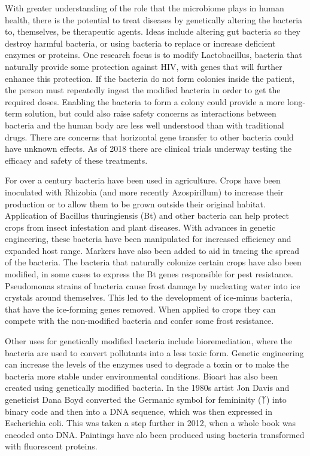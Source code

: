 With greater understanding of the role that the microbiome plays in human health, there is the potential to treat diseases by genetically altering the bacteria to, themselves, be therapeutic agents. Ideas include altering gut bacteria so they destroy harmful bacteria, or using bacteria to replace or increase deficient enzymes or proteins. One research focus is to modify Lactobacillus, bacteria that naturally provide some protection against HIV, with genes that will further enhance this protection. If the bacteria do not form colonies inside the patient, the person must repeatedly ingest the modified bacteria in order to get the required doses. Enabling the bacteria to form a colony could provide a more long-term solution, but could also raise safety concerns as interactions between bacteria and the human body are less well understood than with traditional drugs. There are concerns that horizontal gene transfer to other bacteria could have unknown effects. As of 2018 there are clinical trials underway testing the efficacy and safety of these treatments.

For over a century bacteria have been used in agriculture. Crops have been inoculated with Rhizobia (and more recently Azospirillum) to increase their production or to allow them to be grown outside their original habitat. Application of Bacillus thuringiensis (Bt) and other bacteria can help protect crops from insect infestation and plant diseases. With advances in genetic engineering, these bacteria have been manipulated for increased efficiency and expanded host range. Markers have also been added to aid in tracing the spread of the bacteria. The bacteria that naturally colonize certain crops have also been modified, in some cases to express the Bt genes responsible for pest resistance. Pseudomonas strains of bacteria cause frost damage by nucleating water into ice crystals around themselves. This led to the development of ice-minus bacteria, that have the ice-forming genes removed. When applied to crops they can compete with the non-modified bacteria and confer some frost resistance.

Other uses for genetically modified bacteria include bioremediation, where the bacteria are used to convert pollutants into a less toxic form. Genetic engineering can increase the levels of the enzymes used to degrade a toxin or to make the bacteria more stable under environmental conditions. Bioart has also been created using genetically modified bacteria. In the 1980s artist Jon Davis and geneticist Dana Boyd converted the Germanic symbol for femininity (ᛉ) into binary code and then into a DNA sequence, which was then expressed in Escherichia coli. This was taken a step further in 2012, when a whole book was encoded onto DNA. Paintings have alo been produced using bacteria transformed with fluorescent proteins.

